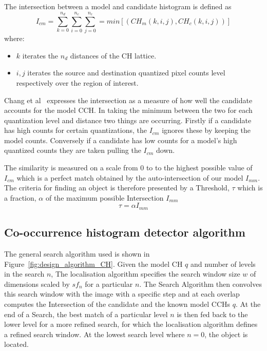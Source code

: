 The intersection between a model and candidate histogram is defined as
\begin{equation}\label{eqn:intersection}
    I_{cm} = \sum_{k=0}^{n_d}\sum_{i=0}^{n_c}\sum_{j=0}^{n_c} = min[(CH_m(k,i,j),CH_c(k,i,j))]
\end{equation}
where:
\begin{itemize}
    \item $k$ iterates the $n_d$ distances of the CH lattice.
    \item $i,j$ iterates the source and destination quantized pixel counts level respectively over the
        region of interest.
\end{itemize}
Chang et al~\cite{Chang1999} expresses the intersection as a measure of how well the
candidate accounts for the model CCH. In taking the minimum between the two
for each quantization level and distance two things are occurring. Firstly if a
candidate has high counts for certain quantizations, the $I_{cm}$ ignores these
by keeping the model counts. Conversely if a candidate has low counts for a
model's high quantized counts they are taken pulling the $I_{cm}$ down.

The similarity is measured on a scale from 0 to to the highest possible value of
$I_{cm}$ which is a perfect match obtained by the auto-intersection of our
model $I_{mm}$.
The criteria for finding an object is therefore presented by a Threshold, $\tau$ which
is a fraction, $\alpha$ of the maximum possible Intersection $I_{mm}$
$$\tau=\alpha I_{mm}$$


\subsection{Co-occurrence histogram detector algorithm}


The general search algorithm used is shown in
Figure~\ref{fig:design_algorithm_CH}. Given the model CH $q$ and number of
levels in the search $n$, The localisation algorithm specifies the search window
size $w$ of dimensions scaled by $sf_n$ for a particular $n$. The Search
Algorithm then convolves this search window with the image with a specific step
and at each overlap computes the Intersection of the candidate and the known
model CCHs $q$.  At the end of a Search, the best match of a particular level
$n$ is then fed back to the lower level for a more refined search, for which the
localisation algorithm defines a refined search window. At the lowest search
level where $n=0$, the object is located.


